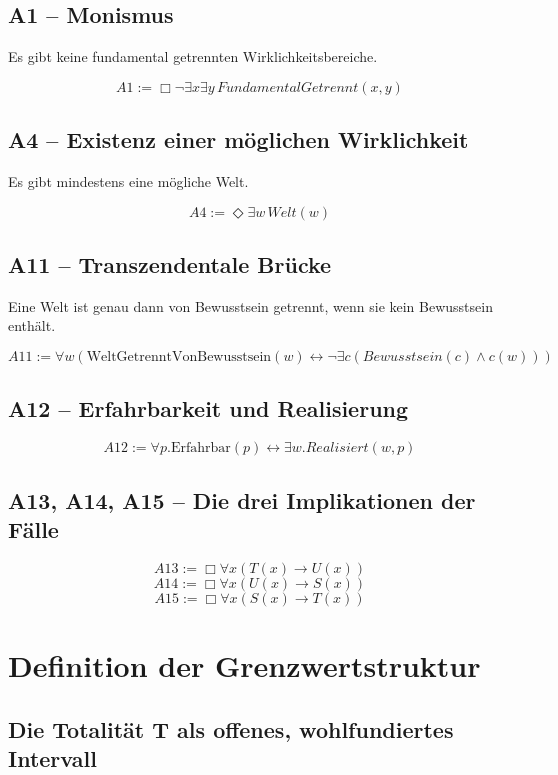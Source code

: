 \documentclass[
]{article}
\begin{document}
\subsection{A1 – Monismus}

Es gibt keine fundamental getrennten Wirklichkeitsbereiche.

\[
\boxed{A1 := \Box\neg\exists x\exists y\, FundamentalGetrennt(x,y)}
\]

\subsection{A4 – Existenz einer möglichen Wirklichkeit}

Es gibt mindestens eine mögliche Welt.

\[
\boxed{A4 := \Diamond\exists w\, Welt(w)}
\]

\subsection{A11 – Transzendentale Brücke}

Eine Welt ist genau dann von Bewusstsein getrennt, wenn sie kein Bewusstsein enthält.

\[
\boxed{A11 := \forall w \left( \text{WeltGetrenntVonBewusstsein}(w) \leftrightarrow \neg \exists c (Bewusstsein(c) \land c(w)) \right)}
\]

\subsection{A12 – Erfahrbarkeit und Realisierung}

\[
\boxed{A12 := \forall p. \text{Erfahrbar}(p) \leftrightarrow \exists w. Realisiert(w, p)}
\]

\subsection{A13, A14, A15 – Die drei Implikationen der Fälle}

\[
\boxed{A13 := \Box\forall x(T(x) \rightarrow U(x))}
\]
\[
\boxed{A14 := \Box\forall x(U(x) \rightarrow S(x))}
\]
\[
\boxed{A15 := \Box\forall x(S(x) \rightarrow T(x))}
\]

\section{Definition der Grenzwertstruktur}

\subsection{Die Totalität T als offenes, wohlfundiertes Intervall}
\end{document}
